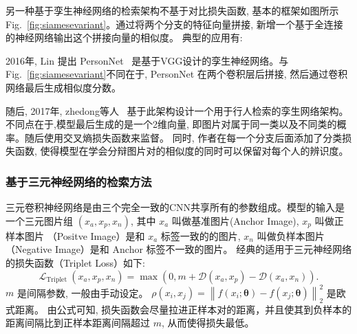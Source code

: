 另一种基于孪生神经网络的检索架构不基于对比损失函数,  基本的框架如图所示Fig.~\ref{fig:siamesevariant}。通过将两个分支的特征向量拼接, 新增一个基于全连接的神经网络输出这个拼接向量的相似度。 典型的应用有:\par
2016年, Lin 提出 PersonNet~\cite{wu2016personnet} 是基于VGG设计的孪生神经网络。与Fig.~\ref{fig:siamesevariant}不同在于, PersonNet 在两个卷积层后拼接, 然后通过卷积网络最后生成相似度分数。 \par
随后, 2017年, zhedong等人~\cite{zheng2017discriminatively} 基于此架构设计一个用于行人检索的孪生网络架构。不同点在于,模型最后生成的是一个2维向量, 即图片对属于同一类以及不同类的概率。随后使用交叉熵损失函数来监督。 同时, 作者在每一个分支后面添加了分类损失函数, 使得模型在学会分辩图片对的相似度的同时可以保留对每个人的辨识度。
\subsubsection{基于三元神经网络的检索方法}
三元卷积神经网络是由三个完全一致的CNN共享所有的参数组成。模型的输入是一个三元图片组 $(x_a, x_p, x_n)$, 其中 $x_a$ 叫做基准图片(Anchor Image), $x_p$ 叫做正样本图片 （Positve Image）是和 $x_a$ 标签一致的的图片, $x_n$ 叫做负样本图片 （Negative Image）是和 Anchor 标签不一致的图片。 经典的适用于三元神经网络的损失函数（Triplet Loss）如下:
\begin{equation}
    \mathcal{L}_{\text {Triplet }}\left(x_a, x_p, x_n\right)=\max \left(0, m+\mathcal{D}\left(x_a, x_p\right)-\mathcal{D}\left(x_a, x_n\right)\right).
    \label{eq:triplet}
\end{equation}
$m$ 是间隔参数, 一般由手动设定。
$
    \rho\left(x_i, x_j\right)=\left\|f\left(x_i ; \boldsymbol{\theta}\right)-f\left(x_j ; \boldsymbol{\theta}\right)\right\|_2^2
$ 是欧式距离。 由公式可知, 损失函数会尽量拉进正样本对的距离，并且使其到负样本的距离间隔比到正样本距离间隔超过 $m$, 从而使得损失最低。 \par


